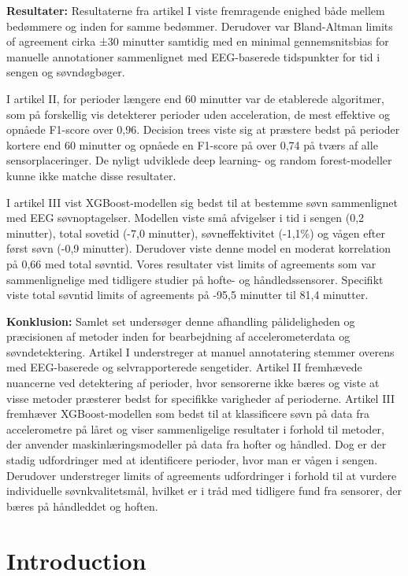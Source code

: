 \documentclass[
  10pt,
]{scrbook}
\let\originaltextbf\textbf
\renewcommand{\textbf}[1]{\textcolor{color1}{\textsf{\originaltextbf{#1}}}}
\begin{document}
\textbf{Resultater:} Resultaterne fra artikel I viste fremragende
enighed både mellem bedømmere og inden for samme bedømmer. Derudover var
Bland-Altman limits of agreement cirka ±30 minutter samtidig med en
minimal gennemsnitsbias for manuelle annotationer sammenlignet med
EEG-baserede tidspunkter for tid i sengen og søvndøgbøger.

I artikel II, for perioder længere end 60 minutter var de etablerede
algoritmer, som på forskellig vis detekterer perioder uden acceleration,
de mest effektive og opnåede F1-score over 0,96. Decision trees viste
sig at præstere bedst på perioder kortere end 60 minutter og opnåede en
F1-score på over 0,74 på tværs af alle sensorplaceringer. De nyligt
udviklede deep learning- og random forest-modeller kunne ikke matche
disse resultater.

I artikel III vist XGBoost-modellen sig bedst til at bestemme søvn
sammenlignet med EEG søvnoptagelser. Modellen viste små afvigelser i tid
i sengen (0,2 minutter), total sovetid (-7,0 minutter), søvneffektivitet
(-1,1\%) og vågen efter først søvn (-0,9 minutter). Derudover viste
denne model en moderat korrelation på 0,66 med total søvntid. Vores
resultater vist limits of agreements som var sammenlignelige med
tidligere studier på hofte- og håndledssensorer. Specifikt viste total
søvntid limits of agreements på -95,5 minutter til 81,4 minutter.

\textbf{Konklusion:} Samlet set undersøger denne afhandling
pålideligheden og præcisionen af metoder inden for bearbejdning af
accelerometerdata og søvndetektering. Artikel I understreger at manuel
annotatering stemmer overens med EEG-baserede og selvrapporterede
sengetider. Artikel II fremhævede nuancerne ved detektering af perioder,
hvor sensorerne ikke bæres og viste at visse metoder præsterer bedst for
specifikke varigheder af perioderne. Artikel III fremhæver
XGBoost-modellen som bedst til at klassificere søvn på data fra
accelerometre på låret og viser sammenligelige resultater i forhold til
metoder, der anvender maskinlæringsmodeller på data fra hofter og
håndled. Dog er der stadig udfordringer med at identificere perioder,
hvor man er vågen i sengen. Derudover understreger limits of agreements
udfordringer i forhold til at vurdere individuelle søvnkvalitetsmål,
hvilket er i tråd med tidligere fund fra sensorer, der bæres på
håndleddet og hoften.

\hypertarget{introduction}{%
\chapter{Introduction}\label{introduction}}
\end{document}
